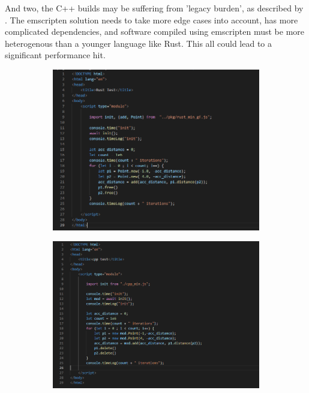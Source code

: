 And two, the C++ builds may be suffering from 'legacy burden', as described by \citet{ammann_maplibre-rs_2022}. 
The emscripten solution needs to take more edge cases into account, has more complicated dependencies, and software compiled using emscripten must be more heterogenous than a younger language like Rust.
This all could lead to a significant performance hit.

\begin{figure}
  \centering
  \begin{subfigure}[b]{0.32\linewidth}
    \graphicspath{{../../assets/images/6.1.5/}}
    \centering
    \includegraphics[width=\linewidth]{rust.PNG}
    \caption{}
  \end{subfigure}%
  \qquad %
  \begin{subfigure}[b]{0.32\linewidth}
    \graphicspath{{../../assets/images/6.1.5/}}
    \centering
    \includegraphics[width=\linewidth]{cpp.PNG}

\end{subfigure}
\end{figure}
